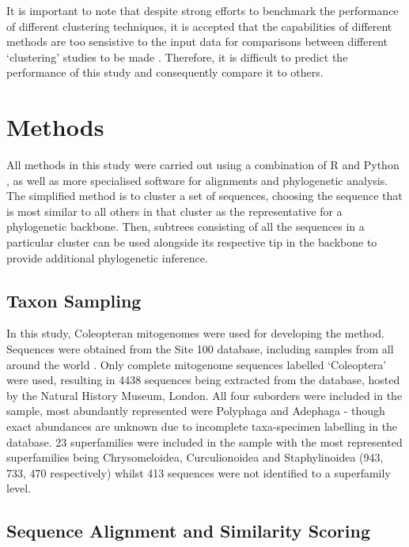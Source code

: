 \documentclass[12pt]{article}
\begin{document}
  It is important to note that despite strong efforts to benchmark the performance of different clustering techniques, it is accepted that the capabilities of different methods are too sensistive to the input data for comparisons between different `clustering' studies to be made \cite{Tseng2007}. Therefore, it is difficult to predict the performance of this study and consequently compare it to others.
  
  \section{Methods}

  All methods in this study were carried out using a combination of R \cite{R} and Python \cite{python}, as well as more specialised software for alignments and phylogenetic analysis. The simplified method is to cluster a set of sequences, choosing the sequence that is most similar to all others in that cluster as the representative for a phylogenetic backbone. Then, subtrees consisting of all the sequences in a particular cluster can be used alongside its respective tip in the backbone to provide additional phylogenetic inference.

    \subsection{Taxon Sampling}

  In this study, Coleopteran mitogenomes were used for developing the method. Sequences were obtained from the Site 100 database, including samples from all around the world \cite{Site100}. Only complete mitogenome sequences labelled `Coleoptera’ were used, resulting in 4438 sequences being extracted from the database, hosted by the Natural History Museum, London. All four suborders were included in the sample, most abundantly represented were Polyphaga and Adephaga - though exact abundances are unknown due to incomplete taxa-specimen labelling in the database. 23 superfamilies were included in the sample with the most represented superfamilies being Chrysomeloidea, Curculionoidea and Staphylinoidea (943,  733, 470 respectively) whilst 413 sequences were not identified to a superfamily level.

    \subsection{Sequence Alignment and Similarity Scoring}
\end{document}
